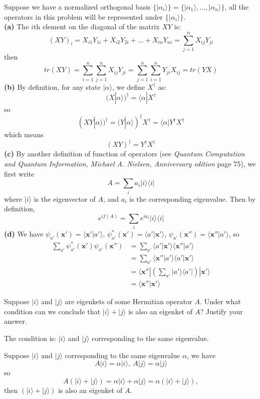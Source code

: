 \documentclass[UTF8,12pt]{article} %
\makeatletter
\newenvironment{proof}[1][\protect\proofname]{\par
\normalfont\topsep6\p@\@plus6\p@\relax
\trivlist
\itemindent\parindent
\item[\hskip\labelsep
\scshape
#1]\ignorespaces
}{%
\endtrivlist\@endpefalse
}
\renewcommand{\proofname}{\it{Solution}}
\makeatother
\begin{document}
\begin{proof}
Suppose we have a normalized orthogonal basis $\{|\alpha_i\rangle\} = \{|\alpha_1\rangle, ... , |\alpha_n\rangle\}$, all the operators in this problem will be represented under $\{|\alpha_i\rangle\}$.\\
\textbf{(a)} The $i$th element on the diagonal of the matrix $XY$ is:
$$(XY)_i = X_{i1}Y_{1i} + X_{i2}Y_{2i} + ... + X_{in}Y_{ni} = \sum_{j=1}^{n} X_{ij}Y_{ji}$$
then
$$tr(XY) = \sum_{i=1}^{n}\sum_{j=1}^{n} X_{ij}Y_{ji} = \sum_{j=1}^{n}\sum_{i=1}^{n} Y_{ji}X_{ij} = tr(YX)$$
\textbf{(b)} By definition, for any state $|\alpha \rangle$, we define $X^\dagger$ as:
$$(X|\alpha \rangle)^\dagger = \langle \alpha|X^\dagger$$
so
$$(XY|\alpha \rangle)^\dagger = (Y|\alpha \rangle)^\dagger X^\dagger = \langle \alpha|Y^\dagger X^\dagger$$
which means
$$(XY)^\dagger = Y^\dagger X^\dagger$$
\textbf{(c)} By another definition of function of operators (see \textit{Quantum Computation and Quantum Information, Michael A. Nielsen, Anniversary edition} page 75), we first write
$$A = \sum_{i} a_i |i\rangle\langle i|$$
where $|i\rangle$ is the eigenvector of $A$, and $a_i$ is the corresponding eigenvalue. Then by definition,
$$e^{if(A)} = \sum_{i} e^{ia_i} |i\rangle\langle i|$$
\textbf{(d)} We have $\psi_{a'}(\bm{x'}) = \langle\bm{x'}|a'\rangle$, $\psi_{a'}^*(\bm{x'}) = \langle a'|\bm{x'}\rangle$, $\psi_{a'}(\bm{x''}) = \langle\bm{x''}|a'\rangle$, so
\begin{align*}
\sum_{a'}\psi_{a'}^{*}(\bm{x'})\psi_{a'}(\bm{x''}) &= \sum_{a'} \langle a'|\bm{x'}\rangle \langle\bm{x''}|a'\rangle \\
&= \sum_{a'} \langle\bm{x''}|a'\rangle \langle a'|\bm{x'}\rangle \\
&= \langle\bm{x''}|\left(\sum_{a'} |a'\rangle \langle a'|\right) |\bm{x'}\rangle \\
&= \langle\bm{x''}|\bm{x'}\rangle
\end{align*}
\end{proof}

\begin{exercise}{1.6}{}
Suppose $|i\rangle$ and $|j\rangle$ are eigenkets of some Hermitian operator $A$. Under what condition can we conclude that $|i\rangle + |j\rangle$ is also an eigenket of $A$? Justify your answer.
\end{exercise}

\begin{proof}
The condition is: $|i\rangle$ and $|j\rangle$ corresponding to the same eigenvalue.

Suppose $|i\rangle$ and $|j\rangle$ corresponding to the same eigenvalue $\alpha$, we have
$$A|i\rangle = \alpha |i\rangle,~A|j\rangle = \alpha |j\rangle$$
so
$$A(|i\rangle + |j\rangle) = \alpha |i\rangle + \alpha |j\rangle = \alpha (|i\rangle + |j\rangle),$$
then $(|i\rangle + |j\rangle)$ is also an eigenket of $A$.
\end{proof}
\end{document}
